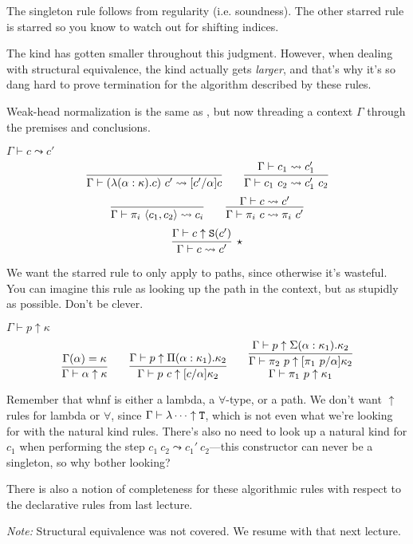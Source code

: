 The singleton rule follows from regularity (i.e. soundness). The other starred rule is starred
so you know to watch out for shifting indices.

The kind has gotten smaller throughout this judgment. However, when dealing with structural
equivalence, the kind actually gets \emph{larger}, and that's why it's so dang hard to prove
termination for the algorithm described by these rules.

Weak-head normalization is the same as , but now threading a context $\Gamma$
through the premises and conclusions.

\begin{judgment}
  $\Gamma \vdash c \leadsto c'$
  \[
    \infer{\Gamma \vdash (\lambda(\alpha : \kappa).c)~c' \leadsto [c'/\alpha]c}{}
    \qquad
    \infer{\Gamma \vdash c_1~c_2 \leadsto c_1'~c_2}{\Gamma \vdash c_1 \leadsto c_1'}
  \]
  \[
    \infer{\Gamma \vdash \pi_i~\langle c_1, c_2 \rangle \leadsto c_i}{}
    \qquad
    \infer{\Gamma \vdash \pi_i~c \leadsto \pi_i~c'}{\Gamma\vdash c \leadsto c'}
  \]
  \[
    \infer[\star]{\Gamma \vdash c \leadsto c'}{\Gamma \vdash c \uparrow \S(c')}
  \]
\end{judgment}

We want the starred rule to only apply to paths, since otherwise it's wasteful. You can
imagine this rule as looking up the path in the context, but as stupidly as possible. Don't
be clever.

\begin{judgment}
  $\Gamma \vdash p \uparrow \kappa$
  \[
    \infer{\Gamma \vdash \alpha \uparrow \kappa}{\Gamma(\alpha) = \kappa}
    \qquad
    \infer{\Gamma \vdash p~c \uparrow [c/\alpha]\kappa_2}
      {\Gamma \vdash p \uparrow \Pi(\alpha : \kappa_1).\kappa_2}
    \qquad
    \infer
      {\deduce
        {\Gamma \vdash \pi_1~p \uparrow \kappa_1}
        {\Gamma \vdash \pi_2~p \uparrow [\pi_1~p/\alpha]\kappa_2}
      }
      {\Gamma \vdash p \uparrow \Sigma(\alpha : \kappa_1).\kappa_2}
  \]
\end{judgment}

Remember that whnf is either a lambda, a $\forall$-type, or a path. We don't want $\uparrow$ rules
for lambda or $\forall$, since $\Gamma \vdash \lambda \cdots \uparrow \textnormal{\texttt{T}}$, which is not even
what we're looking for with the natural kind rules. There's also no need to look up
a natural kind for $c_1$ when performing the step $c_1~c_2 \leadsto c_1'~c_2$---this
constructor can never be a singleton, so why bother looking?

There is also a notion of completeness for these algorithmic rules with respect to the
declarative rules from last lecture.

\emph{Note:} Structural equivalence was not covered. We resume with that next lecture.
